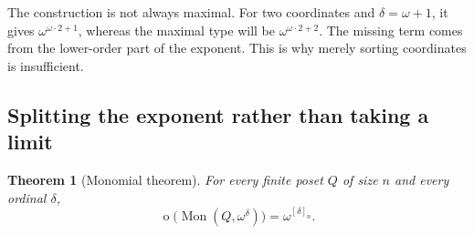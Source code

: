 \documentclass[11pt,a4paper]{article}
\newtheorem{theorem}{Theorem}[section]
\theoremstyle{definition}
\theoremstyle{remark}
\newcommand{\Mon}{\operatorname{Mon}}
\newcommand{\otype}{\operatorname{o}}
\newcommand{\Nrep}[2]{\left[#1\right]_{#2}}
\begin{document}
The construction is not always maximal. For two coordinates and
$\delta=\omega+1$, it gives $\omega^{\omega\cdot2+1}$, whereas the
maximal type will be $\omega^{\omega\cdot2+2}$. The missing term comes
from the lower-order part of the exponent. This is why merely sorting
coordinates is insufficient.

\subsection{Splitting the exponent rather than taking a limit}
\begin{theorem}[Monomial theorem]\label{thm:monomial}
For every finite poset $Q$ of size $n$ and every ordinal $\delta$,
\begin{equation}\label{eq:monomial}
 \boxed{\otype\bigl(\Mon(Q,\omega^\delta)\bigr)
       =\omega^{\Nrep{\delta}{n}}.}
\end{equation}
\end{theorem}
\end{document}
